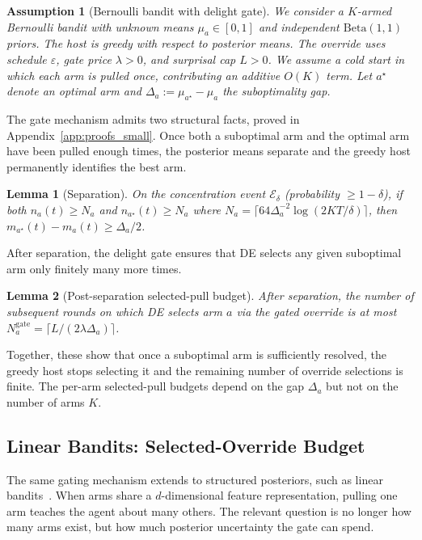 \documentclass{article}
\newtheorem{lemma} {Lemma}
\newtheorem{assumption} {Assumption}
\begin{document}
\begin{assumption}[Bernoulli bandit with delight gate]
\label{assump:main}
We consider a $K$-armed Bernoulli bandit with unknown means $\mu_a \in [0,1]$ and independent $\mathrm{Beta}(1,1)$ priors.
The host is greedy with respect to posterior means.
The override uses schedule $\varepsilon$, gate price $\lambda>0$, and surprisal cap $L>0$.
We assume a cold start in which each arm is pulled once, contributing an additive $O(K)$ term.
Let $a^\star$ denote an optimal arm and $\Delta_a := \mu_{a^\star} - \mu_a$ the suboptimality gap.
\end{assumption}

The gate mechanism admits two structural facts, proved in Appendix~\ref{app:proofs_small}.
Once both a suboptimal arm and the optimal arm have been pulled enough times, the posterior means separate and the greedy host permanently identifies the best arm.

\begin{lemma}[Separation]
\label{lem:separation_main}
On the concentration event $\mathcal{E}_\delta$ (probability $\ge 1-\delta$), if both $n_a(t) \ge N_a$ and $n_{a^\star}(t) \ge N_a$ where $N_a = \lceil 64\Delta_a^{-2}\log(2KT/\delta)\rceil$, then $m_{a^\star}(t) - m_a(t) \ge \Delta_a/2$.
\end{lemma}

After separation, the delight gate ensures that DE selects any given suboptimal arm only finitely many more times.

\begin{lemma}[Post-separation selected-pull budget]
\label{lem:gate_main}
After separation, the number of subsequent rounds on which DE selects arm $a$ via the gated override is at most
$N_a^{\mathrm{gate}} = \lceil L/(2\lambda\Delta_a)\rceil$.
\end{lemma}

Together, these show that once a suboptimal arm is sufficiently resolved, the greedy host stops selecting it and the remaining number of override selections is finite.
The per-arm selected-pull budgets depend on the gap $\Delta_a$ but not on the number of arms $K$.

\subsection{Linear Bandits: Selected-Override Budget}
\label{sec:small_linear}

The same gating mechanism extends to structured posteriors, such as linear bandits~\citep{dani2008stochastic,abbasi2011improved}.
When arms share a $d$-dimensional feature representation, pulling one arm teaches the agent about many others.
The relevant question is no longer how many arms exist, but how much posterior uncertainty the gate can spend.
\end{document}
